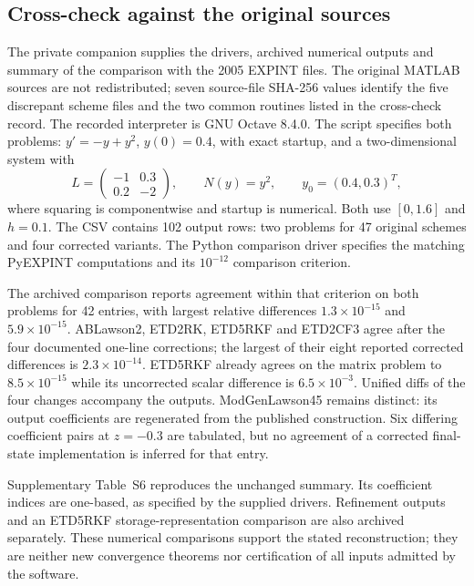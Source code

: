

\subsection{Cross-check against the original sources}\label{sec:crosscheck}

The private companion supplies the drivers, archived numerical outputs and
summary of the comparison with the 2005 EXPINT files.  The original MATLAB
sources are not redistributed; seven source-file SHA-256 values identify the
five discrepant scheme files and the two common routines listed in the
cross-check record.  The recorded interpreter is GNU Octave 8.4.0.  The script
 specifies both
problems: $y'=-y+y^2$, $y(0)=0.4$, with exact startup, and a two-dimensional
system with
\[
 L=\begin{pmatrix}-1&0.3\\0.2&-2\end{pmatrix},\qquad
 N(y)=y^2,\qquad y_0=(0.4,0.3)^T,
\]
where squaring is componentwise and startup is numerical.  Both use
$[0,1.6]$ and $h=0.1$.  The CSV contains 102 output rows: two problems for
47 original schemes and four corrected variants.  The Python comparison
driver specifies the matching PyEXPINT computations and its $10^{-12}$
comparison criterion.

The archived comparison reports agreement within that criterion on both
problems for 42 entries, with largest relative differences
$1.3\times10^{-15}$ and $5.9\times10^{-15}$.  ABLawson2, ETD2RK,
ETD5RKF and ETD2CF3 agree after the four documented one-line corrections;
the largest of their eight reported corrected differences is
$2.3\times10^{-14}$.  ETD5RKF already agrees on the matrix problem to
$8.5\times10^{-15}$ while its uncorrected scalar difference is
$6.5\times10^{-3}$.  Unified diffs of the four changes accompany the outputs.
ModGenLawson45 remains distinct: its output coefficients are regenerated
from the published construction.  Six differing coefficient pairs at
$z=-0.3$ are tabulated, but no agreement of a corrected final-state
implementation is inferred for that entry.

Supplementary Table~S6 reproduces the unchanged summary.  Its coefficient
indices are one-based, as specified by the supplied drivers.  Refinement
outputs and an ETD5RKF storage-representation comparison are also archived
separately.  These numerical comparisons support the stated reconstruction;
they are neither new convergence theorems nor certification of all inputs
admitted by the software.

